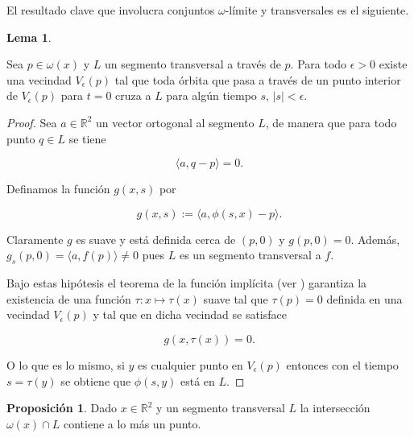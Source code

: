 \documentclass[11pt]{book}
\theoremstyle{definition}
\numberwithin{definition}{section}
\theoremstyle{theorem}
\newtheorem{lemma}{Lema}
\newtheorem{proposition}{Proposición}
\numberwithin{theorem}{section}
\numberwithin{lemma}{section}
\numberwithin{corollary}{section}
\theoremstyle{plain}
\numberwithin{example}{section}
\newcommand{\R}{{\ensuremath{\mathbb{R}}}}
\begin{document}
El resultado clave que involucra conjuntos $\omega$-límite y transversales es el siguiente.

\begin{lemma} \label{lem:transversalexistencias}

Sea $p \in \omega(x)$ y $L$ un segmento transversal a través de $p$. Para todo $\epsilon > 0$ existe una vecindad $V_\epsilon(p)$ tal que toda órbita que pasa a través de un punto interior de $V_\epsilon(p)$ para $t = 0$ cruza a $L$ para algún tiempo $s$, $|s| < \epsilon$. 
\end{lemma}
\begin{proof}
Sea $a \in \R^2$ un vector ortogonal al segmento $L$, de manera que para todo punto $q \in L$ se tiene

$$ \langle a, q-p \rangle = 0.$$

Definamos la función $g(x,s)$ por

$$ g(x,s) := \langle a, \phi(s, x) - p \rangle.$$

Claramente $g$ es suave y está definida cerca de $(p,0)$ y $g(p,0) = 0$. Además, $g_s(p,0) = \langle a, f(p) \rangle \neq 0$ pues $L$ es un segmento transversal a $f$.

Bajo estas hipótesis el teorema de la función implícita (ver \cite{spivak,fleming}) garantiza la existencia de una función $\tau: x \mapsto \tau(x)$ suave tal que $\tau(p) = 0$ definida en una vecindad $V_\epsilon(p)$ y tal que en dicha vecindad se satisface

$$ g(x, \tau(x)) = 0. $$

O lo que es lo mismo, si $y$ es cualquier punto en $V_\epsilon(p)$ entonces con el tiempo $s = \tau(y)$ se obtiene que $\phi(s, y)$ está en $L$.

\end{proof}

\begin{proposition}Dado $x \in \R^2$ y un segmento transversal $L$ la intersección $\omega(x) \cap L$ contiene a lo más un punto.
\end{proposition}
\end{document}
